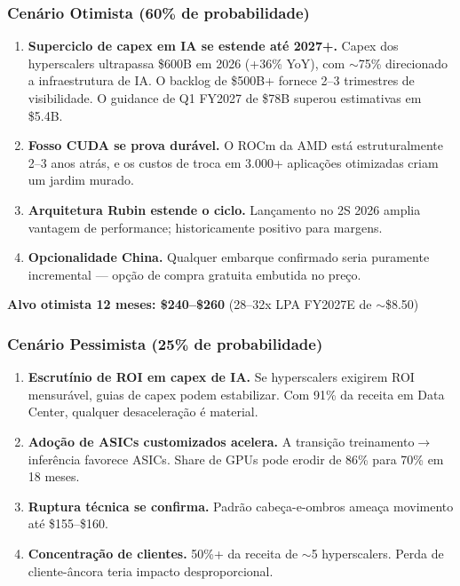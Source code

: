 \documentclass[11pt,a4paper]{article}
\begin{document}
\subsubsection{Cen\'ario Otimista (60\% de probabilidade)}

\begin{enumerate}[nosep]
  \item \textbf{Superciclo de capex em IA se estende at\'e 2027+.} Capex dos hyperscalers ultrapassa \$600B em 2026 (+36\% YoY), com $\sim$75\% direcionado a infraestrutura de IA. O backlog de \$500B+ fornece 2--3 trimestres de visibilidade. O guidance de Q1 FY2027 de \$78B superou estimativas em \$5.4B.
  \item \textbf{Fosso CUDA se prova dur\'avel.} O ROCm da AMD est\'a estruturalmente 2--3 anos atr\'as, e os custos de troca em 3.000+ aplica\c{c}\~oes otimizadas criam um jardim murado.
  \item \textbf{Arquitetura Rubin estende o ciclo.} Lan\c{c}amento no 2S 2026 amplia vantagem de performance; historicamente positivo para margens.
  \item \textbf{Opcionalidade China.} Qualquer embarque confirmado seria puramente incremental --- op\c{c}\~ao de compra gratuita embutida no pre\c{c}o.
\end{enumerate}

\noindent\textbf{Alvo otimista 12 meses: \$240--\$260} (28--32x LPA FY2027E de $\sim$\$8.50)

\subsubsection{Cen\'ario Pessimista (25\% de probabilidade)}

\begin{enumerate}[nosep]
  \item \textbf{Escrut\'inio de ROI em capex de IA.} Se hyperscalers exigirem ROI mensur\'avel, guias de capex podem estabilizar. Com 91\% da receita em Data Center, qualquer desacelera\c{c}\~ao \'e material.
  \item \textbf{Ado\c{c}\~ao de ASICs customizados acelera.} A transi\c{c}\~ao treinamento$\rightarrow$infer\^encia favorece ASICs. Share de GPUs pode erodir de 86\% para 70\% em 18 meses.
  \item \textbf{Ruptura t\'ecnica se confirma.} Padr\~ao cabe\c{c}a-e-ombros amea\c{c}a movimento at\'e \$155--\$160.
  \item \textbf{Concentra\c{c}\~ao de clientes.} 50\%+ da receita de $\sim$5 hyperscalers. Perda de cliente-\^ancora teria impacto desproporcional.
\end{enumerate}
\end{document}
